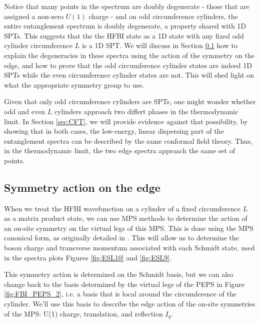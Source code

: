 
Notice that many points in the spectrum are doubly degenerate - those that are 
assigned a non-zero $U(1)$ charge - and on odd circumference cylinders, the 
entire entanglement spectrum is doubly degenerate, a property shared with 1D SPTs. This suggests that the the HFBI state as a 1D state with any  
fixed odd cylinder circumference $L$ is a 1D SPT. We will discuss in
Section \ref{sec:symmetry} how to explain the degeneracies in these spectra 
using the action of the symmetry on the edge, and how to prove that the odd 
circumference cylinder states are indeed 1D SPTs while the even circumference 
cylinder states are not. This will shed light on what the appropriate symmetry 
group to use.

Given that only odd circumference cylinders are SPTs, one might wonder whether 
odd and even $L$ cylinders approach two differt phases in the thermodynamic 
limit. In Section \ref{sec:CFT}, we will provide evidence against that 
possibility, by showing that in both cases, the low-energy, linear dispersing 
part of the entanglement spectra can be described by the same conformal field 
theory. Thus, in the thermodynamic limit, the two edge spectra approach the 
same set of points.
	
\subsection{Symmetry action on the edge}
\label{sec:symmetry}

When we treat the HFBI wavefunction on a 
cylinder of a fixed circumference $L$ as a matrix product state, we can use 
MPS methods to determine the action of an on-site symmetry on 
the virtual legs of this MPS. This is done using the MPS canonical form, as 
originally detailed in \cite{perezgarcia2008}. This will allow us to determine 
the boson charge and transverse momentum associated with each Schmidt state, 
used in the spectra plots Figures \ref{fig:ESL10} and \ref{fig:ESL9}.

This symmetry action is determined on the Schmidt basis, but we can also 
change back to the basis determined by the virtual legs of the PEPS in Figure 
\ref{fig:FBI_PEPS_2}, i.e. a basis that is local around the circumference of 
the cylinder. We'll use this basis to describe the edge action of the on-site 
symmetries of the MPS: U(1) charge, translation, and reflection $I_y$. 

